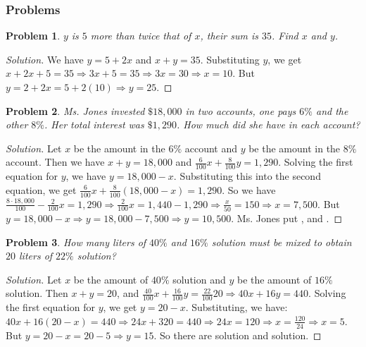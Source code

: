 \documentclass[oneside]{book}
\theoremstyle{mystyle}
\newtheorem{problem}{Problem}[section]
\begin{document}
\subsubsection{Problems}
\begin{problem}
$y$ is $5$ more than twice that of $x$, their sum is $35$. Find $x$ and $y$.
\end{problem}
\begin{proof}[Solution]
We have $y = 5+2x$ and $x+y = 35$. Substituting $y$, we get $x+2x+5 = 35\Rightarrow 3x+5 = 35\Rightarrow 3x = 30 \Rightarrow \boxed{x = 10}$. But $y = 2+2x = 5+2(10) \Rightarrow \boxed{y= 25}$.
\end{proof}
\begin{problem}
Ms. Jones invested $\$18,\!000$ in two accounts, one pays $6\%$ and the other $8\%$. Her total interest was $\$1,\!290$. How much did she have in each account?
\end{problem}
\begin{proof}[Solution]
Let $x$ be the amount in the $6\%$ account and $y$ be the amount in the $8\%$ account. Then we have $x+y = 18,\!000$ and $\frac{6}{100}x + \frac{8}{100}y = 1,\!290$. Solving the first equation for $y$, we have $y= 18,\!000 - x$. Substituting this into the second equation, we get $\frac{6}{100}x + \frac{8}{100}(18,\!000 - x) = 1,\!290$. So we have $\frac{8 \cdot 18,000}{100} - \frac{2}{100}x = 1,\!290 \Rightarrow \frac{2}{100}x = 1,\!440 - 1,\!290 \Rightarrow \frac{x}{50} = 150 \Rightarrow \boxed{x = 7,\!500}$. But $y = 18,\!000 - x \Rightarrow y= 18,\!000 - 7,\!500 \Rightarrow \boxed{y = 10,\!500}$. Ms. Jones put , and .
\end{proof}
\begin{problem}
How many liters of $40\%$ and $16\%$ solution must be mixed to obtain $20$ liters of $22\%$ solution?
\end{problem}
\begin{proof}[Solution]
Let $x$ be the amount of $40\%$ solution and $y$ be the amount of $16\%$ solution. Then $x+y = 20$, and $\frac{40}{100}x +\frac{16}{100}y = \frac{22}{100}20\Rightarrow 40x+16y = 440$. Solving the first equation for $y$, we get $y = 20 - x$. Substituting, we have: $40x + 16(20-x) = 440\Rightarrow 24x + 320 = 440 \Rightarrow 24x = 120\Rightarrow x=\frac{120}{24}\Rightarrow \boxed{x = 5}$. But $y = 20 - x = 20 - 5 \Rightarrow \boxed{y = 15}$. So there are  solution and  solution.
\end{proof}
\end{document}

